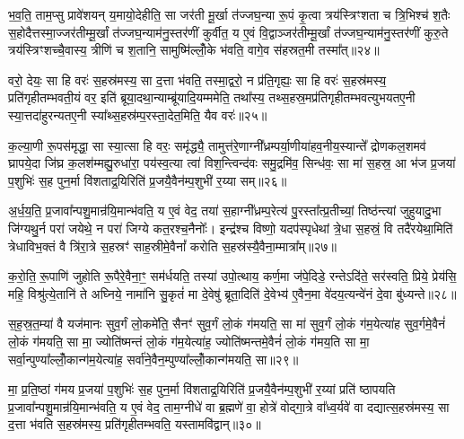 भ॒व॒ति॒ ताम॒प्सु प्रावे॑शयन् य॒मायो॒देहीति॒ सा जर॑ती मू॒र्खा त॑ज्जघ॒न्या रू॒पं कृ॒त्वा त्रय॑स्त्रिꣳशता च त्रि॒भिश्च॑ श॒तैः स॒होदैत्तस्मा॒ज्जर॑तीम्मू॒र्खां त॑ज्जघ॒न्याम॑नु॒स्तर॑णीं कुर्वीत॒ य ए॒वं वि॒द्वाञ्जर॑तीम्मू॒र्खां त॑ज्जघ॒न्याम॑नु॒स्तर॑णीं कुरु॒ते त्रय॑स्त्रिꣳशच्चै॒वास्य॒ त्रीणि॑ च श॒तानि॒ सामुष्मि॑ल्लोँ॒के भ॑वति॒ वागे॒व स॑हस्रत॒मी तस्मा᳚त्॥२४॥

वरो॒ देयः॒ सा हि वरः॑ स॒हस्र॑मस्य॒ सा द॒त्ता भ॑वति॒ तस्मा॒द्वरो॒ न प्र॑ति॒गृह्यः॒ सा हि वरः॑ स॒हस्र॑मस्य॒ प्रति॑गृहीत\-म्भवती॒यं वर॒ इति॑ ब्रूया॒दथा॒न्याम्ब्रू॑यादि॒यम्ममेति॒ तथा᳚स्य॒ तथ्स॒हस्र॒मप्र॑तिगृहीतम्भवत्युभयतए॒नी स्या॒त्तदा॑हुरन्यत\-ए॒नी स्या᳚थ्स॒हस्र॑म्प॒रस्ता॒देत॒मिति॒ यैव वरः॑॥२५॥

क॒ल्या॒णी रू॒पस॑मृद्धा॒ सा स्या॒त्सा हि वरः॒ समृ॑द्ध्यै॒ तामुत्त॑रे॒णाग्नी᳚ध्रम्पर्या॒णीया॑हव॒नीय॒स्यान्ते᳚ द्रोणकल॒शमव॑ घ्रापये॒दा जि॑घ्र क॒लश॑म्मह्यु॒रुधा॑रा॒ पय॑स्व॒त्या त्वा॑ विश॒न्त्विन्द॑वः समु॒द्रमि॑व॒ सिन्ध॑वः॒ सा मा॑ स॒हस्र॒ आ भ॑ज प्र॒जया॑ प॒शुभिः॑ स॒ह पुन॒र्मा वि॑शताद्र॒यिरिति॑ प्र॒जयै॒वैन॑म्प॒शुभी॑ र॒य्या सम्॥२६॥

अ॒र्ध॒य॒ति॒ प्र॒जावा᳚न्पशु॒मान्र॑यि॒मान्भ॑वति॒ य ए॒वं वेद॒ तया॑ स॒हाग्नी᳚ध्रम्प॒रेत्य॑ पु॒रस्ता᳚त्प्र॒तीच्यां॒ तिष्ठ॑न्त्यां जुहुयादु॒भा जि॑ग्यथु॒र्न परा॑ जयेथे॒ न परा॑ जिग्ये कत॒रश्च॒नैनोः᳚। इन्द्र॑श्च विष्णो॒ यदप॑स्पृधेथां त्रे॒धा स॒हस्रं॒ वि तदै॑रयेथा॒मिति॑ त्रेधाविभ॒क्तं वै त्रि॑रा॒त्रे स॒हस्रꣳ॑ साह॒स्रीमे॒वैनां᳚ करोति स॒हस्र॑स्यै॒वैना॒म्मात्रा᳚म्॥२७॥

क॒रो॒ति॒ रू॒पाणि॑ जुहोति रू॒पैरे॒वैना॒ꣳ॒ सम॑र्धयति॒ तस्या॑ उपो॒त्थाय॒ कर्ण॒मा ज॑पे॒दिडे॒ रन्ते\-ऽदि॑ते॒ सर॑स्वति॒ प्रिये॒ प्रेय॑सि॒ महि॒ विश्रु॑त्ये॒तानि॑ ते अघ्निये॒ नामा॑नि सु॒कृतं॑ मा दे॒वेषु॑ ब्रूता॒दिति॑ दे॒वेभ्य॑ ए॒वैन॒मा वे॑दय॒त्यन्वे॑नं दे॒वा बु॑ध्यन्ते॥२८॥

{\anuvakamend[{ए॒तदे॒तस्यां᳚ वी॒र्य॑मस्य त्रि॒भिश्च॑ द॒त्ता स॑हस्रत॒मी तस्मा॑दे॒व वरः॒ सम्मात्रा॒मेका॒न्नच॑त्वारि॒ꣳ॒शच्च॑॥६॥}]}

स॒ह॒स्र॒त॒म्या॑ वै यज॑मानः सुव॒र्गं लो॒कमे॑ति॒ सैनꣳ॑ सुव॒र्गं लो॒कं ग॑मयति॒ सा मा॑ सुव॒र्गं लो॒कं ग॑म॒येत्या॑ह सुव॒र्गमे॒वैनं॑ लो॒कं ग॑मयति॒ सा मा॒ ज्योति॑ष्मन्तं लो॒कं ग॑म॒येत्या॑ह॒ ज्योति॑ष्मन्तमे॒वैनं॑ लो॒कं ग॑मय॒ति सा मा॒ सर्वा॒न्पुण्या᳚\-ल्लोँ॒कान्ग॑म॒येत्या॑ह॒ सर्वा॑ने॒वैन॒म्पुण्या᳚ल्लोँ॒कान्ग॑मयति॒ सा॥२९॥

मा॒ प्र॒ति॒ष्ठां ग॑मय प्र॒जया॑ प॒शुभिः॑ स॒ह पुन॒र्मा वि॑शताद्र॒यिरिति॑ प्र॒जयै॒वैन॑म्प॒शुभी॑ र॒य्यां प्रति॑ ष्ठापयति प्र॒जावा᳚न्पशु॒मान्र॑यि॒मान्भ॑वति॒ य ए॒वं वेद॒ ताम॒ग्नीधे॑ वा ब्र॒ह्मणे॑ वा॒ होत्रे॑ वोद्गा॒त्रे वा᳚ध्व॒र्यवे॑ वा दद्यात्स॒हस्र॑मस्य॒ सा द॒त्ता भ॑वति स॒हस्र॑मस्य॒ प्रति॑गृहीतम्भवति॒ यस्तामवि॑द्वान्॥३०॥

